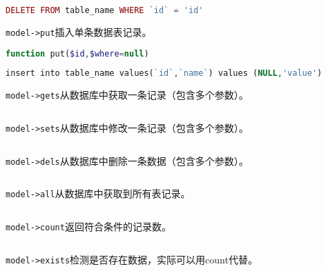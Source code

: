 \begin{lstlisting}[language=PHP]
DELETE FROM table_name WHERE `id` = 'id'
\end{lstlisting}



\texttt{model->put}插入单条数据表记录。

\begin{lstlisting}[language=PHP]
function put($id,$where=null)
\end{lstlisting}



\begin{lstlisting}[language=PHP]
insert into table_name values(`id`,`name`) values (NULL,'value')
\end{lstlisting}

\texttt{model->gets}从数据库中获取一条记录（包含多个参数）。

\begin{lstlisting}[language=PHP]

\end{lstlisting}

\texttt{model->sets}从数据库中修改一条记录（包含多个参数）。

\begin{lstlisting}[language=PHP]

\end{lstlisting}


\texttt{model->dels}从数据库中删除一条数据（包含多个参数）。

\begin{lstlisting}[language=PHP]

\end{lstlisting}

\texttt{model->all}从数据库中获取到所有表记录。


\begin{lstlisting}[language=PHP]

\end{lstlisting}


\texttt{model->count}返回符合条件的记录数。




\begin{lstlisting}[language=PHP]

\end{lstlisting}

\texttt{model->exists}检测是否存在数据，实际可以用count代替。



\begin{lstlisting}[language=PHP]

\end{lstlisting}

